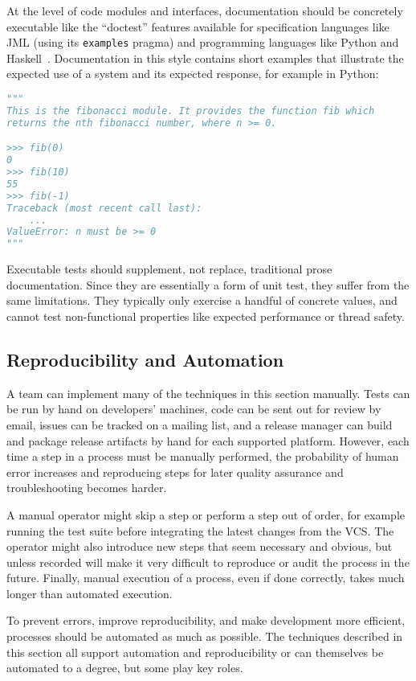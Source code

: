 At the level of code modules and interfaces, documentation should be
concretely executable like the ``doctest'' features available for
specification languages like JML (using its \texttt{examples} pragma)
and programming languages like Python and
Haskell~\cite{python3doctest}. Documentation in this style contains
short examples that illustrate the expected use of a system and its
expected response, for example in Python:

\begin{lstlisting}[language=Python]
"""
This is the fibonacci module. It provides the function fib which
returns the nth fibonacci number, where n >= 0.

>>> fib(0)
0
>>> fib(10)
55
>>> fib(-1)
Traceback (most recent call last):
    ...
ValueError: n must be >= 0
"""
\end{lstlisting}

Executable tests should supplement, not replace, traditional prose
documentation. Since they are essentially a form of unit test, they
suffer from the same limitations. They typically only exercise a
handful of concrete values, and cannot test non-functional properties
like expected performance or thread safety.

\subsection{Reproducibility and Automation}

A team can implement many of the techniques in this section
manually. Tests can be run by hand on developers' machines, code can
be sent out for review by email, issues can be tracked on a mailing
list, and a release manager can build and package release artifacts by
hand for each supported platform. However, each time a step in a
process must be manually performed, the probability of human error
increases and reproducing steps for later quality assurance and
troubleshooting becomes harder.

A manual operator might skip a step or perform a step out of order,
for example running the test suite before integrating the latest
changes from the VCS. The operator might also introduce new steps that
seem necessary and obvious, but unless recorded will make it very
difficult to reproduce or audit the process in the future. Finally,
manual execution of a process, even if done correctly, takes much
longer than automated execution.

To prevent errors, improve reproducibility, and make development more
efficient, processes should be automated as much as possible. The
techniques described in this section all support automation and
reproducibility or can themselves be automated to a degree, but some
play key roles.

